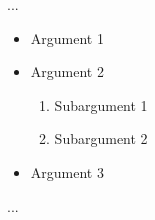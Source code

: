 ...
\begin{itemize}
  \item Argument 1
  \item Argument 2
  \begin{enumerate}
    \item Subargument 1
    \item Subargument 2
  \end{enumerate}
  \item Argument 3
\end{itemize}
...